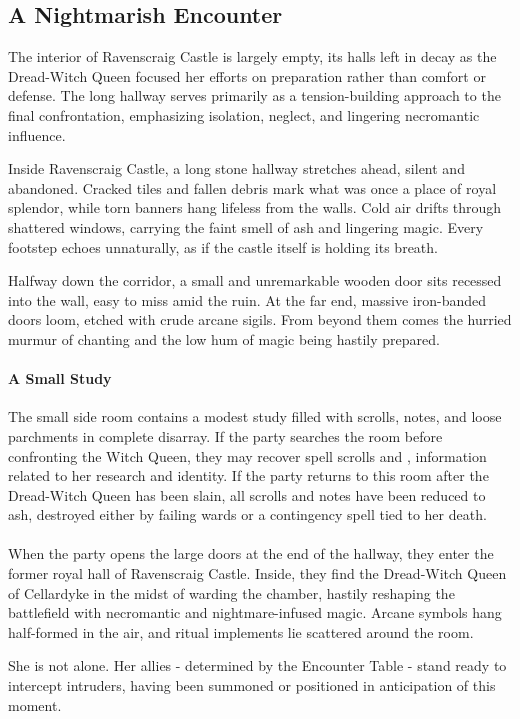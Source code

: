 \subsection*{A Nightmarish Encounter}
{\entryfont The interior of Ravenscraig Castle is largely empty, its halls left in decay as the Dread-Witch Queen focused her efforts on preparation rather than comfort or defense. The long hallway serves primarily as a tension-building approach to the final confrontation, emphasizing isolation, neglect, and lingering necromantic influence.}

\begin{DndReadAloud}
	Inside Ravenscraig Castle, a long stone hallway stretches ahead, silent and abandoned. Cracked tiles and fallen debris mark what was once a place of royal splendor, while torn banners hang lifeless from the walls. Cold air drifts through shattered windows, carrying the faint smell of ash and lingering magic. Every footstep echoes unnaturally, as if the castle itself is holding its breath.

	Halfway down the corridor, a small and unremarkable wooden door sits recessed into the wall, easy to miss amid the ruin. At the far end, massive iron-banded doors loom, etched with crude arcane sigils. From beyond them comes the hurried murmur of chanting and the low hum of magic being hastily prepared.
\end{DndReadAloud}

{\entryfont\paragraph*{A Small Study} The small side room contains a modest study filled with scrolls, notes, and loose parchments in complete disarray. If the party searches the room before confronting the Witch Queen, they may recover spell scrolls and \hyperref[resource:LoreScrollsDreadWitchQueen]{}, information related to her research and identity. If the party returns to this room after the Dread-Witch Queen has been slain, all scrolls and notes have been reduced to ash, destroyed either by failing wards or a contingency spell tied to her death.\\\\
When the party opens the large doors at the end of the hallway, they enter the former royal hall of Ravenscraig Castle. Inside, they find the Dread-Witch Queen of Cellardyke in the midst of warding the chamber, hastily reshaping the battlefield with necromantic and nightmare-infused magic. Arcane symbols hang half-formed in the air, and ritual implements lie scattered around the room.

She is not alone. Her allies - determined by the Encounter Table - stand ready to intercept intruders, having been summoned or positioned in anticipation of this moment.}

